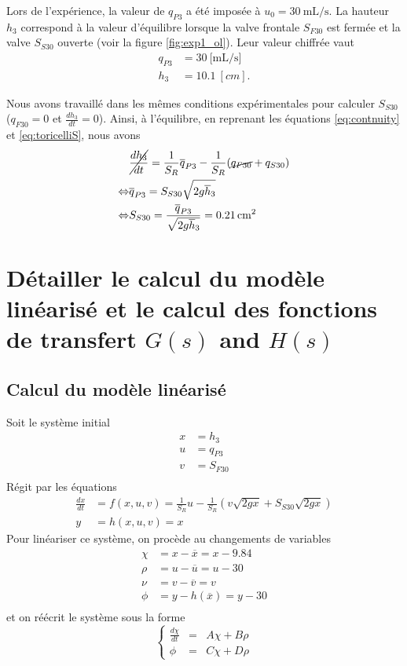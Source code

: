 \documentclass[frenchb, paper=a4, fontsize=11pt]{scrartcl}
\newcommand*\eq[1]{\overline{#1}} 				%
\numberwithin{equation}{section}					%
\numberwithin{figure}{section}					%
\numberwithin{table}{section}						%
\begin{document}
Lors de l'expérience, la valeur de $q_{P3}$ a été imposée  à $u_0 = \SI{30}{\milli\liter\per\second}$. La hauteur $h_3$ correspond à la valeur d'équilibre lorsque la valve frontale $S_{F30}$ est fermée et la valve $S_{S30}$ ouverte (voir la figure \ref{fig:exp1_ol}). Leur valeur chiffrée vaut
\begin{align}
q_{P3} & = \SI{30}{[\milli\liter\per\second]}\\
h_3 & = \SI{10.1}{[cm]}.
\end{align}

Nous avons travaillé dans les mêmes conditions expérimentales pour calculer $S_{S30}$ ($q_{F30} = 0$ et $\frac{dh_3}{dt} = 0$). Ainsi, à l'équilibre, en reprenant les équations \ref{eq:contnuity} et \ref{eq:toricelliS}, nous avons
\begin{align}
&\cancel{\frac{dh_3}{dt}} = \frac{1}{S_R}\eq{q}_{P3} - \frac{1}{S_R}(\cancel{q_{F30}}+q_{S30})\\
\Leftrightarrow & \eq{q}_{P3} = S_{S30} \sqrt{2g\eq{h}_3} \\
\Leftrightarrow & S_{S30} = \frac{\eq{q}_{P3}}{ \sqrt{2g\eq{h}_3}} = \SI{0.21}{cm^2}
\end{align}

\section{Détailler le calcul du modèle linéarisé et le calcul des fonctions de transfert $G(s)$ and $H(s)$}

\subsection{Calcul du modèle linéarisé}

Soit le système initial
\begin{align}
x &= h_3 \\
u &= q_{P3}\\
v &= S_{F30}\\
\end{align}
Régit par les équations
\begin{align}
\frac{dx}{dt} &= f(x,u,v) = \frac{1}{S_R}u - \frac{1}{S_R}(v\sqrt{2gx} + S_{S30}\sqrt{2gx})\\
y &= h(x,u,v) = x
\end{align}
Pour linéariser ce système, on procède au changements de variables
\begin{align}
\chi &= x-\eq{x} = x - 9.84\\
\rho &= u-\eq{u} = u - 30\\
\nu &= v - \eq{v} = v\\
\phi &= y - h(\eq{x}) = y - 30\\
\end{align}
et on réécrit le système sous la forme
\begin{equation}
\left\{ \begin{array}{ccc}
\frac{d\chi}{dt} &=& A\chi + B\rho \\
\phi &=& C\chi + D\rho
\end{array}
\right.
\end{equation}
\end{document}
